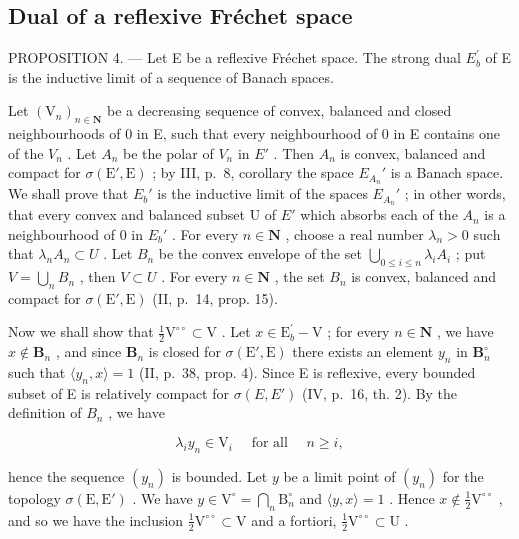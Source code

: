 \subsection{Dual of a reflexive Fréchet space}

PROPOSITION 4. --- Let E be a reflexive Fréchet space. The strong dual \(E_{b}^{\prime}\) of E is the inductive limit of a sequence of Banach spaces.

Let \((\mathrm{V}_{n})_{n\in\mathbf{N}}\) be a decreasing sequence of convex, balanced and closed neighbourhoods of 0 in E, such that every neighbourhood of 0 in E contains one of the \(V_{n}\) . Let \(A_{n}\) be the polar of \(V_{n}\) in \(E'\) . Then \(A_{n}\) is convex, balanced and compact for \(\sigma(\mathrm{E}',\mathrm{E})\) ; by III, p.~8, corollary the space \(E_{A_{n}}'\) is a Banach space. We shall prove that \(E_{b}'\) is the inductive limit of the spaces \(E_{A_{n}}'\) ; in other words, that every convex and balanced subset U of \(E'\) which absorbs each of the \(A_{n}\) is a neighbourhood of 0 in \(E_{b}'\) . For every \(n\in\mathbf{N}\) , choose a real number \(\lambda_{n}>0\) such that \(\lambda_{n}A_{n}\subset U\) . Let \(B_{n}\) be the convex envelope of the set \(\bigcup_{0\leqslant i\leqslant n}\lambda_{i}A_{i}\) ; put \(V=\bigcup_{n}B_{n}\) , then \(V\subset U\) . For every \(n\in\mathbf{N}\) , the set \(B_{n}\) is convex, balanced and compact for \(\sigma(\mathrm{E}',\mathrm{E})\) (II, p.~14, prop. 15).

Now we shall show that \(\frac{1}{2}\mathrm{V}^{\circ \circ}\subset \mathrm{V}\) . Let \(x\in \mathrm{E}_b^\prime -\mathrm{V}\) ; for every \(n\in \mathbf{N}\) , we have \(x\notin \mathbf{B}_n\) , and since \(\mathbf{B}_n\) is closed for \(\sigma (\mathrm{E}',\mathrm{E})\) there exists an element \(y_{n}\) in \(\mathbf{B}_n^\circ\) such that \(\langle y_n, x \rangle = 1\) (II, p.~38, prop. 4). Since E is reflexive, every bounded subset of E is relatively compact for \(\sigma(E, E')\) (IV, p.~16, th. 2). By the definition of \(B_n\) , we have

\[
\lambda_ {i} y _ {n} \in \mathrm{V} _ {i} \quad \text { for   all } \quad n \geqslant i  ,\tag{3}
\]

hence the sequence \((y_{n})\) is bounded. Let \(y\) be a limit point of \((y_{n})\) for the topology \(\sigma(\mathrm{E},\mathrm{E}')\) . We have \(y\in\mathrm{V}^{\circ}=\bigcap_{n}\mathrm{B}_{n}^{\circ}\) and \(\langle y,x\rangle=1\) . Hence \(x\notin\frac{1}{2}\mathrm{V}^{\circ\circ}\) , and so we have the inclusion \(\frac{1}{2}\mathrm{V}^{\circ\circ}\subset\mathrm{V}\) and a fortiori, \(\frac{1}{2}\mathrm{V}^{\circ\circ}\subset\mathrm{U}\) .

